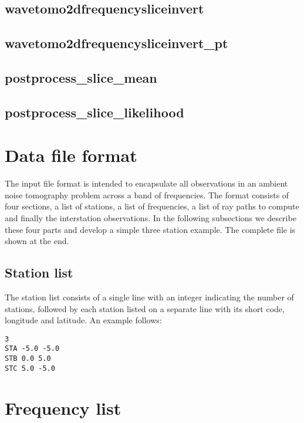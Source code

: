 \documentclass[a4paper,12pt]{article}
\begin{document}
\subsection{wavetomo2dfrequencysliceinvert}

\subsection{wavetomo2dfrequencysliceinvert\_pt}

\subsection{postprocess\_slice\_mean}

\subsection{postprocess\_slice\_likelihood}

\appendix

\section{Data file format}
\label{sec:fileformat}

The input file format is intended to encapsulate all observations in
an ambient noise tomography problem across a band of frequencies. The
format consists of four sections, a list of stations, a list of
frequencies, a list of ray paths to compute and finally the
interstation observations.  In the following subsections we describe
these four parts and develop a simple three station example. The
complete file is shown at the end.

\subsection{Station list}

The station list consists of a single line with an integer indicating
the number of stations, followed by each station listed on a separate
line with its short code, longitude and latitude. An example follows:

\begin{verbatim}
3
STA -5.0 -5.0
STB 0.0 5.0
STC 5.0 -5.0
\end{verbatim}

\section{Frequency list}
\end{document}
